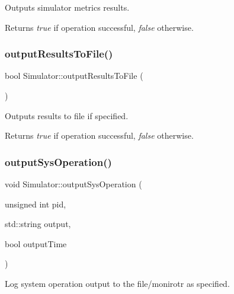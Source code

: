 Outputs simulator metrics results. 

\begin{DoxyReturn}{Returns}
{\itshape true} if operation successful, {\itshape false} otherwise. 
\end{DoxyReturn}
\hypertarget{class_simulator_a0245347cd0c75ec9d30f108d794cd7a6}{}\label{class_simulator_a0245347cd0c75ec9d30f108d794cd7a6} 
\subsubsection{\texorpdfstring{output\+Results\+To\+File()}{outputResultsToFile()}}
{\footnotesize\ttfamily bool Simulator\+::output\+Results\+To\+File (\begin{DoxyParamCaption}{ }\end{DoxyParamCaption})\hspace{0.3cm}{\ttfamily [private]}}



Outputs results to file if specified. 

\begin{DoxyReturn}{Returns}
{\itshape true} if operation successful, {\itshape false} otherwise. 
\end{DoxyReturn}
\hypertarget{class_simulator_a7980ffee280efa8378e800c37686793e}{}\label{class_simulator_a7980ffee280efa8378e800c37686793e} 
\subsubsection{\texorpdfstring{output\+Sys\+Operation()}{outputSysOperation()}}
{\footnotesize\ttfamily void Simulator\+::output\+Sys\+Operation (\begin{DoxyParamCaption}\item[{unsigned int}]{pid,  }\item[{std\+::string}]{output,  }\item[{bool}]{output\+Time }\end{DoxyParamCaption})\hspace{0.3cm}{\ttfamily [private]}}



Log system operation output to the file/monirotr as specified. 


